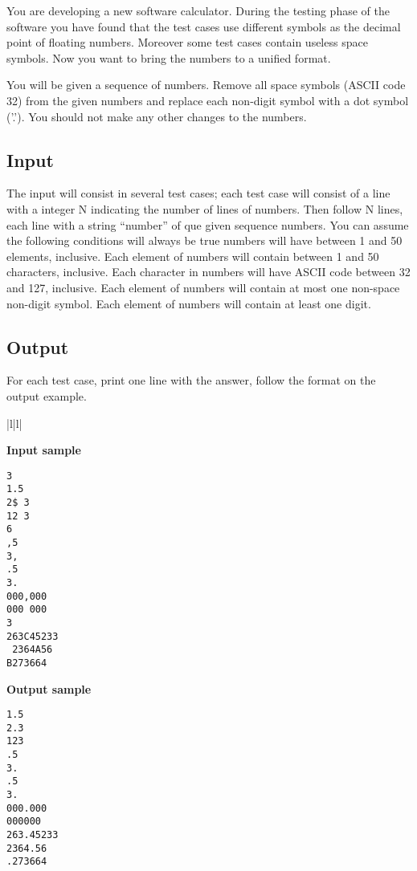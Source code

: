 You are developing a new software calculator. During the testing phase of the software you have found that the test cases use different symbols as the decimal point of floating numbers. Moreover some test cases contain useless space symbols. Now you want to bring the numbers to a unified format.

You will be given a sequence of numbers. Remove all space symbols (ASCII code 32) from the given numbers and replace each non-digit symbol with a dot symbol ('.'). You should not make any other changes to the numbers.

\subsection* {Input}

The input will consist in several test cases; each test case will consist of a line with a integer N indicating the number of lines of numbers. Then follow N lines, each line with a string “number” of que given sequence numbers. You can assume the following conditions will always be true	
numbers will have between 1 and 50 elements, inclusive.
Each element of numbers will contain between 1 and 50 characters, inclusive.
Each character in numbers will have ASCII code between 32 and 127, inclusive.
Each element of numbers will contain at most one non-space non-digit symbol.
Each element of numbers will contain at least one digit.

\subsection* {Output}

For each test case, print one line with the answer, follow the format on the output example.

\outputnotice

\vspace{12pt}
\begin{minipage}[c]{1\textwidth}%
	\begin{center}
		\begin{tabular}{|l|l|} \hline 
		\begin{minipage}[t]{0.6\textwidth}%
		\bf{Input sample} \\
		\begin{verbatim}
3
1.5
2$ 3
12 3
6
,5
3,
.5
3.
000,000
000 000
3
263C45233 
 2364A56
B273664

\end{verbatim}
    \end{minipage}%


    \begin{minipage}[t]{0.3\textwidth}%
      \textbf{Output sample} \\      
\begin{verbatim}
1.5
2.3
123
.5
3.
.5
3.
000.000
000000
263.45233
2364.56
.273664

\end{verbatim}
\end{minipage}\\
    \hline
\end{tabular}\end{center}\end{minipage}%
